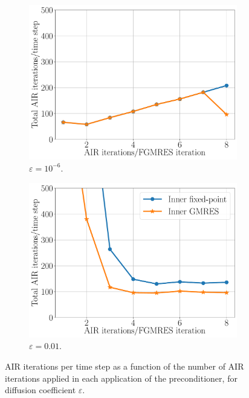 \documentclass[review]{siamart}
\begin{document}
\begin{figure}[h!]
\centering

  \centering
  \begin{subfigure}[b]{0.475\textwidth}
	\includegraphics[width = \textwidth]{./figures/dg_advdiff_o2_1e-6.pdf}
	\caption{$\varepsilon = 10^{-6}$.}
	\label{fig:dg_o2_1e-6}
  \end{subfigure}
   \begin{subfigure}[b]{0.475\textwidth}
	\includegraphics[width = \textwidth]{./figures/dg_advdiff_o2_1e-2.pdf}
	\caption{$\varepsilon = 0.01$.}
	\label{fig:dg_o2_1e-2}
  \end{subfigure}
\caption{AIR iterations per time step as a function of the number of
AIR iterations applied in each application of the preconditioner, for
diffusion coefficient $\varepsilon$.}
\label{fig:dg_o2}
\end{figure}
\end{document}
